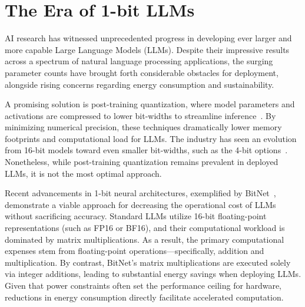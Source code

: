 \begin{abstract}
Groundbreaking advancements, exemplified by BitNet~\cite{bitnet}, have ushered in an era of 1-bit Large Language Models (LLMs). In this study, we present a novel 1-bit LLM architecture, designated as \textbf{}, which constrains every model parameter to one of three values: \{-1, 0, 1\}. Remarkably, this approach achieves parity with standard full-precision (FP16 or BF16) Transformer LLMs of equivalent size and trained with the same token count, in terms of perplexity and downstream task effectiveness. Simultaneously, it yields substantial benefits in latency, memory usage, throughput, and energy efficiency. Importantly, the 1.58-bit LLM establishes an alternative scaling law and provides new training methodologies for developing the next wave of high-efficiency, high-performance LLMs. Additionally, this technology suggests new computational strategies and paves the way for hardware tailored specifically for 1-bit LLM operations.
\end{abstract}

\section{The Era of 1-bit LLMs}

AI research has witnessed unprecedented progress in developing ever larger and more capable Large Language Models (LLMs). Despite their impressive results across a spectrum of natural language processing applications, the surging parameter counts have brought forth considerable obstacles for deployment, alongside rising concerns regarding energy consumption and sustainability.

A promising solution is post-training quantization, where model parameters and activations are compressed to lower bit-widths to streamline inference~\cite{smoothquant, gptq, quip, quip_sharp}. By minimizing numerical precision, these techniques dramatically lower memory footprints and computational load for LLMs. The industry has seen an evolution from 16-bit models toward even smaller bit-widths, such as the 4-bit options~\cite{gptq, awq}. Nonetheless, while post-training quantization remains prevalent in deployed LLMs, it is not the most optimal approach.

Recent advancements in 1-bit neural architectures, exemplified by BitNet~\cite{bitnet}, demonstrate a viable approach for decreasing the operational cost of LLMs without sacrificing accuracy. Standard LLMs utilize 16-bit floating-point representations (such as FP16 or BF16), and their computational workload is dominated by matrix multiplications. As a result, the primary computational expenses stem from floating-point operations—specifically, addition and multiplication. By contrast, BitNet’s matrix multiplications are executed solely via integer additions, leading to substantial energy savings when deploying LLMs. Given that power constraints often set the performance ceiling for hardware, reductions in energy consumption directly facilitate accelerated computation.

